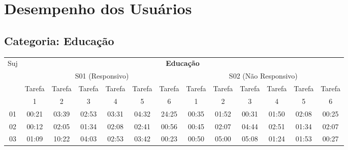 \chapter{Desempenho dos Usuários}
\section{Categoria: Educação}

\footnotesize%
\begin{center}
\begin{sideways}
\begin{tabular}{|l|l|l|l|l|l|l|l|l|l|l|l|l|}
\hline
Suj & \multicolumn{12}{c|}{\textbf{Educação}} \\ 
\cline{2-13}
 & \multicolumn{6}{c|}{S01 (Responsivo)} 
 & \multicolumn{6}{c|}{S02 (Não Responsivo)	} \\ 
\cline{2-13}
 & \multicolumn{1}{c|}{Tarefa} & Tarefa & Tarefa & Tarefa & Tarefa & Tarefa & Tarefa & Tarefa & Tarefa & Tarefa & Tarefa & Tarefa \\ 
 & \multicolumn{1}{c|}{1} & \multicolumn{1}{c|}{2} & \multicolumn{1}{c|}{3} & \multicolumn{1}{c|}{4} & \multicolumn{1}{c|}{5} & \multicolumn{1}{c|}{6} & \multicolumn{1}{c|}{1} & \multicolumn{1}{c|}{2} & \multicolumn{1}{c|}{3} & \multicolumn{1}{c|}{4} & \multicolumn{1}{c|}{5} & \multicolumn{1}{c|}{6} \\ 
\hline
\multicolumn{1}{|c|}{01} & \multicolumn{1}{c|}{00:21} & \multicolumn{1}{c|}{03:39} & \multicolumn{1}{c|}{02:53} & \multicolumn{1}{c|}{03:31} & \multicolumn{1}{c|}{04:32} & \multicolumn{1}{c|}{24:25} & \multicolumn{1}{c|}{00:35} & \multicolumn{1}{c|}{01:52} & \multicolumn{1}{c|}{00:31} & \multicolumn{1}{c|}{01:50} & \multicolumn{1}{c|}{02:08} & \multicolumn{1}{c|}{00:25} \\ 
\hline
\multicolumn{1}{|c|}{02} & \multicolumn{1}{c|}{00:12} & \multicolumn{1}{c|}{02:05} & \multicolumn{1}{c|}{01:34} & \multicolumn{1}{c|}{02:08} & \multicolumn{1}{c|}{02:41} & \multicolumn{1}{c|}{00:56} & \multicolumn{1}{c|}{00:45} & \multicolumn{1}{c|}{02:07} & \multicolumn{1}{c|}{04:44} & \multicolumn{1}{c|}{02:51} & \multicolumn{1}{c|}{01:34} & \multicolumn{1}{c|}{02:07} \\ 
\hline
\multicolumn{1}{|c|}{03} & \multicolumn{1}{c|}{01:09} & \multicolumn{1}{c|}{10:22} & \multicolumn{1}{c|}{04:03} & \multicolumn{1}{c|}{02:53} & \multicolumn{1}{c|}{03:42} & \multicolumn{1}{c|}{00:23} & \multicolumn{1}{c|}{00:50} & \multicolumn{1}{c|}{05:00} & \multicolumn{1}{c|}{05:08} & \multicolumn{1}{c|}{01:24} & \multicolumn{1}{c|}{01:53} & \multicolumn{1}{c|}{00:27} \\ 

\end{tabular}
\end{sideways}
\end{center}
